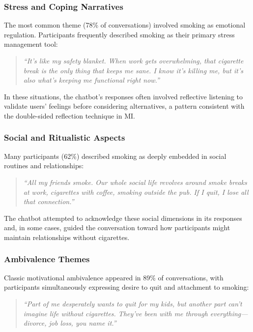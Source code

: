 
\subsubsection{Stress and Coping Narratives}

The most common theme (78\% of conversations) involved smoking as emotional regulation. Participants frequently described smoking as their primary stress management tool:

\begin{quote}
	\textit{``It's like my safety blanket. When work gets overwhelming, that cigarette break is the only thing that keeps me sane. I know it's killing me, but it's also what's keeping me functional right now.''}
\end{quote}

In these situations, the chatbot's responses often involved reflective listening to validate users' feelings before considering alternatives, a pattern consistent with the double-sided reflection technique in MI.

\subsubsection*{Social and Ritualistic Aspects}

Many participants (62\%) described smoking as deeply embedded in social routines and relationships:

\begin{quote}
	\textit{``All my friends smoke. Our whole social life revolves around smoke breaks at work, cigarettes with coffee, smoking outside the pub. If I quit, I lose all that connection.''}
\end{quote}

The chatbot attempted to acknowledge these social dimensions in its responses and, in some cases, guided the conversation toward how participants might maintain relationships without cigarettes.

\subsubsection*{Ambivalence Themes}

Classic motivational ambivalence appeared in 89\% of conversations, with participants simultaneously expressing desire to quit and attachment to smoking:

\begin{quote}
	\textit{``Part of me desperately wants to quit for my kids, but another part can't imagine life without cigarettes. They've been with me through everything---divorce, job loss, you name it.''}
\end{quote}

